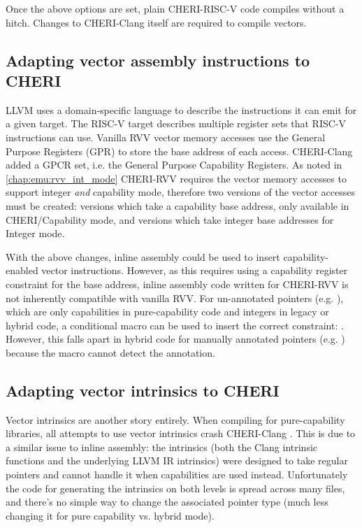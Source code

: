 Once the above options are set, plain CHERI-RISC-V code compiles without a hitch.
Changes to CHERI-Clang itself are required to compile vectors.

\subsection{Adapting vector assembly instructions to CHERI}
LLVM uses a domain-specific language to describe the instructions it can emit for a given target.
The RISC-V target describes multiple register sets that RISC-V instructions can use.
Vanilla RVV vector memory accesses use the General Purpose Registers (GPR) to store the base address of each access.
CHERI-Clang added a GPCR set, i.e. the General Purpose Capability Registers.
As noted in \cref{chap:emu:rvv_int_mode} CHERI-RVV requires the vector memory accesses to support integer \emph{and} capability mode, therefore two versions of the vector accesses must be created: versions which take a capability base address, only available in CHERI/Capability mode, and versions which take integer base addresses for Integer mode.

With the above changes, inline assembly could be used to insert capability-enabled vector instructions.
However, as this requires using a capability register constraint for the base address, inline assembly code written for CHERI-RVV is not inherently compatible with vanilla RVV.
For un-annotated pointers (e.g. ), which are only capabilities in pure-capability code and integers in legacy or hybrid code, a conditional macro can be used to insert the correct constraint: .
However, this falls apart in hybrid code for manually annotated pointers (e.g. ) because the macro cannot detect the annotation.


\subsection{Adapting vector intrinsics to CHERI}
Vector intrinsics are another story entirely.
When compiling for pure-capability libraries, all attempts to use vector intrinsics crash CHERI-Clang .
This is due to a similar issue to inline assembly: the intrinsics (both the Clang intrinsic functions and the underlying LLVM IR intrinsics) were designed to take regular pointers and cannot handle it when capabilities are used instead.
Unfortunately the code for generating the intrinsics on both levels is spread across many files, and there's no simple way to change the associated pointer type (much less changing it for pure capability vs. hybrid mode).

